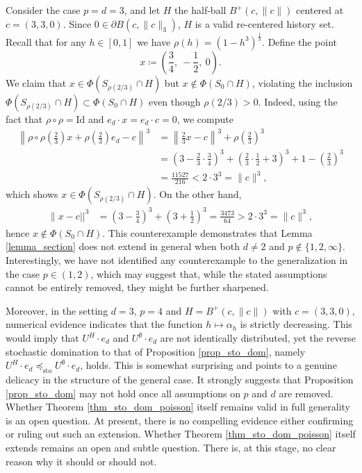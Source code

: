 \documentclass[a4paper, 11pt]{article}
\theoremstyle{plain}
\theoremstyle{definition}
\numberwithin{equation}{section}
\begin{document}
Consider the case $p=d=3$, and let $H$ the half-ball $B^+(c, \|c\|)$ centered at $c=(3, 3, 0)$. Since $0\in\partial B(c,\|c\|_3)$, $H$ is a valid re-centered history set. Recall that for any $h\in[0, 1]$ we have $\rho(h)=(1-h^3)^{\frac{1}{3}}$. Define the point
    \[x\coloneqq\left(\frac{3}{4},~ -\frac{1}{2},~ 0\right).\]
We claim that $x\in\Phi(S_{\rho(2/3)}\cap H)$ but $x\notin\Phi(S_0\cap H)$, violating the inclusion $\Phi(S_{\rho(2/3)}\cap H)\subset \Phi(S_0\cap H)$ even though $\rho(2/3)>0$. Indeed, using the fact that $\rho\circ\rho=\mathrm{Id}$ and $e_d\cdot x=e_d\cdot c=0$, we compute
\begin{equation*}
    \begin{split}
        \left\|\rho\circ\rho\left(\frac{2}{3}\right)x+\rho\left(\frac{2}{3}\right)e_d-c\right\|^3&=\left\|\frac{2}{3}x-c\right\|^3+\rho\left(\frac{2}{3}\right)^3\\&=\left(3-\frac{2}{3}\cdot\frac{3}{4}\right)^3+\left(\frac{2}{3}\cdot\frac{1}{2}+3\right)^3+1-\left(\frac{2}{3}\right)^3\\
    &=\frac{11527}{216}<2\cdot3^3=\|c\|^3,
    \end{split}
\end{equation*}
which shows $x\in\Phi(S_{\rho(2/3)}\cap H)$. On the other hand,
\begin{align*}
    \|x - c||^3 &= \left(3 - \frac{3}{4}\right)^3 + \left(3 + \frac{1}{2}\right)^3 = \frac{3473}{64} > 2 \cdot 3^3 = \|c\|^3,
\end{align*}
hence $x\notin\Phi(S_0\cap H)$. This counterexample demonstrates that Lemma \ref{lemma_section} does not extend in general when both $d\neq 2$ and $p\notin\{1, 2,\infty\}$. Interestingly, we have not identified any counterexample to the generalization in the case $p\in(1, 2)$, which may suggest that, while the stated assumptions cannot be entirely removed, they might be further sharpened.

Moreover, in the setting $d=3$, $p=4$ and  $H=B^+(c, \|c\|)$ with $c=(3, 3, 0)$,  numerical evidence indicates that the function $h\mapsto\alpha_h$ is strictly decreasing. This would imply that $U^H \cdot e_d$ and $U^\emptyset \cdot e_d$ are not identically distributed, yet the reverse stochastic domination to that of Proposition \ref{prop_sto_dom}, namely $U^H \cdot e_d \preceq_{\mathrm{sto}}U^\emptyset \cdot e_d$, holds. This is somewhat surprising and points to a genuine delicacy in the structure of the general case. It strongly suggests that Proposition \ref{prop_sto_dom} may not hold once all assumptions on $p$ and $d$ are removed. Whether Theorem \ref{thm_sto_dom_poisson} itself remains valid in full generality is an open question. At present, there is no compelling evidence either confirming or ruling out such an extension. Whether Theorem \ref{thm_sto_dom_poisson} itself extends remains an open and subtle question. There is, at this stage, no clear reason why it should or should not.
\end{document}
